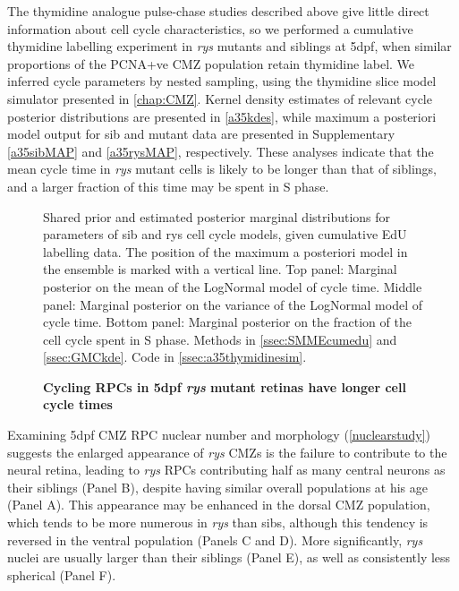 The thymidine analogue pulse-chase studies described above give little direct information about cell cycle characteristics, so we performed a cumulative thymidine labelling experiment in \textit{rys} mutants and siblings at 5dpf, when similar proportions of the PCNA+ve CMZ population retain thymidine label. We inferred cycle parameters by nested sampling, using the thymidine slice model simulator presented in \autoref{chap:CMZ}. Kernel density estimates of relevant cycle posterior distributions are presented in \autoref{a35kdes}, while maximum a posteriori model output for sib and mutant data are presented in Supplementary \autoref{a35sibMAP} and \autoref{a35rysMAP}, respectively. These analyses indicate that the mean cycle time in \textit{rys} mutant cells is likely to be longer than that of siblings, and a larger fraction of this time may be spent in S phase.

\begin{figure}[!h]
    \caption{{\bf Cycling RPCs in 5dpf \textit{rys} mutant retinas have longer cell cycle times}}
    Shared prior and estimated posterior marginal distributions for parameters of sib and rys cell cycle models, given cumulative EdU labelling data. The position of the maximum a posteriori model in the ensemble is marked with a vertical line. Top panel: Marginal posterior on the mean of the LogNormal model of cycle time. Middle panel: Marginal posterior on the variance of the LogNormal model of cycle time. Bottom panel: Marginal posterior on the fraction of the cell cycle spent in S phase.
    Methods in \autoref{ssec:SMMEcumedu} and \autoref{ssec:GMCkde}. Code in \autoref{ssec:a35thymidinesim}.
    \label{a35kdes}
\end{figure}

Examining 5dpf CMZ RPC nuclear number and morphology (\autoref{nuclearstudy}) suggests the enlarged appearance of \textit{rys} CMZs is the failure to contribute to the neural retina, leading to \textit{rys} RPCs contributing half as many central neurons as their siblings (Panel B), despite having similar overall populations at his age (Panel A). This appearance may be enhanced in the dorsal CMZ population, which tends to be more numerous in \textit{rys} than sibs, although this tendency is reversed in the ventral population (Panels C and D). More significantly, \textit{rys} nuclei are usually larger than their siblings (Panel E), as well as consistently less spherical (Panel F).

